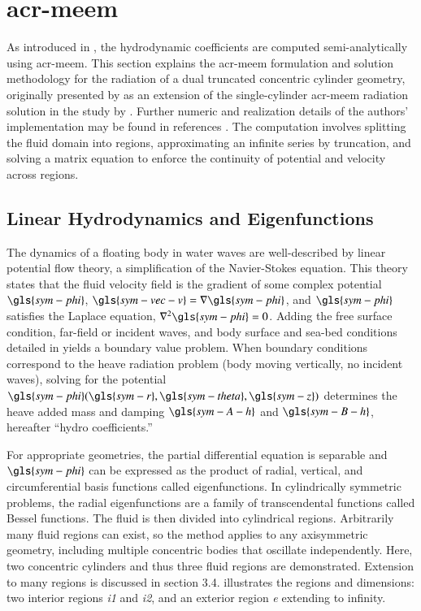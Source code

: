 
\section{\acrlong{acr-meem}}
\label{sec:appendix-meem-details}
As introduced in , the hydrodynamic coefficients are computed semi-analytically using \gls{acr-meem}.
This section explains the \gls{acr-meem} formulation and solution methodology for the radiation of a dual truncated concentric cylinder geometry, originally presented by \citet{mavrakos_hydrodynamic_2004,chau_inertia_2010,chau_inertia_2012} as an extension of the single-cylinder \gls{acr-meem} radiation solution in the study by \citet{yeung_added_1981}.
Further numeric and realization details of the authors' implementation may be found in references \citet{bimali_matrix_2026,best_openflash_2026,mccabe_open-source_2024}.
The computation involves splitting the fluid domain into regions, approximating an infinite series by truncation, and solving a matrix equation to enforce the continuity of potential and velocity across regions.

\subsection{Linear Hydrodynamics and Eigenfunctions}
The dynamics of a floating body in water waves are well-described by linear potential flow theory, a simplification of the Navier-Stokes equation.
This theory states that the fluid velocity field is the gradient of some complex potential $\gls{sym-phi}$, $\gls{sym-vec-v}=\nabla\gls{sym-phi}$, and $\gls{sym-phi}$ satisfies the Laplace equation, $\nabla^2\gls{sym-phi}=0$.
Adding the free surface condition, far-field or incident waves, and body surface and sea-bed conditions detailed in \citet{chatjigeorgiou_analytical_2018} yields a boundary value problem.
When boundary conditions correspond to the heave radiation problem (body moving vertically, no incident waves), solving for the potential $\gls{sym-phi}(\gls{sym-r},\gls{sym-theta},\gls{sym-z})$ determines the heave added mass and damping $\gls{sym-A-h}$ and $\gls{sym-B-h}$, hereafter ``hydro coefficients.”

For appropriate geometries, the partial differential equation is separable and $\gls{sym-phi}$ can be expressed as the product of radial, vertical, and circumferential basis functions called eigenfunctions.
In cylindrically symmetric problems, the radial eigenfunctions are a family of transcendental functions called Bessel functions.
The fluid is then divided into cylindrical regions.
Arbitrarily many fluid regions can exist, so the method applies to any axisymmetric geometry, including multiple concentric bodies that oscillate independently.
Here, two concentric cylinders and thus three fluid regions are demonstrated.
Extension to many regions is discussed in section 3.4.
 illustrates the regions and dimensions: two interior regions \textit{i1} and \textit{i2}, and an exterior region \textit{e} extending to infinity.

